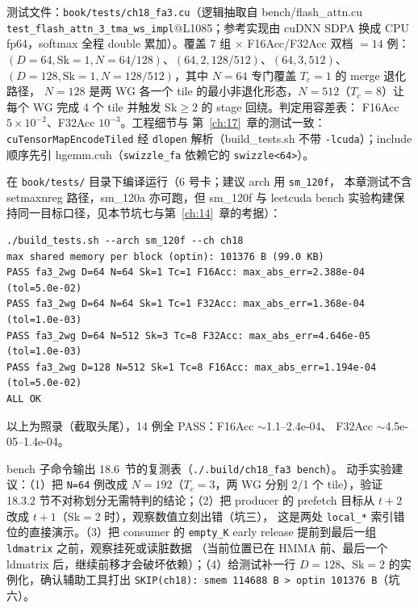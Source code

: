 测试文件：\texttt{book/\allowbreak{}tests/\allowbreak{}ch18\_\allowbreak{}fa3.cu}（逻辑抽取自 bench/flash\_attn.cu
\texttt{test\_\allowbreak{}flash\_\allowbreak{}attn\_\allowbreak{}3\_\allowbreak{}tma\_\allowbreak{}ws\_\allowbreak{}impl}@L1085；参考实现由 cuDNN SDPA 换成
CPU fp64，softmax 全程 double 累加）。覆盖 7 组 $\times$ F16Acc/F32Acc 双档
$=14$ 例：$(D{=}64,\mathrm{Sk}{=}1,N{=}64/128)$、$(64,2,128/512)$、$(64,3,512)$、
$(D{=}128,\mathrm{Sk}{=}1,N{=}128/512)$，其中 $N{=}64$ 专门覆盖
$T_c{=}1$ 的 merge 退化路径，
$N{=}128$ 是两 WG 各一个 tile 的最小非退化形态，$N{=}512$（$T_c{=}8$）让每个
WG 完成 4 个 tile 并触发 $\mathrm{Sk}{\ge}2$ 的 stage 回绕。判定用容差表：
F16Acc $5\times10^{-2}$、F32Acc $10^{-3}$。工程细节与
第~\ref{ch:17}~章的测试一致：\texttt{cu\allowbreak{}Tensor\allowbreak{}Map\allowbreak{}Encode\allowbreak{}Tiled} 经
\texttt{dlopen} 解析（build\_tests.sh 不带 \texttt{-lcuda}）；include 顺序先引
hgemm.cuh（\texttt{swizzle\_fa} 依赖它的 \texttt{swizzle<64>}）。

在 \texttt{book/tests/} 目录下编译运行（6 号卡；建议 arch 用 \texttt{sm\_120f}，
本章测试不含 setmaxnreg 路径，sm\_120a 亦可跑，但 sm\_120f 与
leetcuda bench 实验构建保持同一目标口径，见本节坑七与第~\ref{ch:14}~章的考据）：

\begin{lstlisting}[style=console]
./build_tests.sh --arch sm_120f --ch ch18
max shared memory per block (optin): 101376 B (99.0 KB)
PASS fa3_2wg D=64 N=64 Sk=1 Tc=1 F16Acc: max_abs_err=2.388e-04 (tol=5.0e-02)
PASS fa3_2wg D=64 N=64 Sk=1 Tc=1 F32Acc: max_abs_err=1.368e-04 (tol=1.0e-03)
PASS fa3_2wg D=64 N=512 Sk=3 Tc=8 F32Acc: max_abs_err=4.646e-05 (tol=1.0e-03)
PASS fa3_2wg D=128 N=512 Sk=1 Tc=8 F16Acc: max_abs_err=1.194e-04 (tol=5.0e-02)
ALL OK
\end{lstlisting}

以上为照录（截取头尾），14 例全 PASS：F16Acc $\sim$1.1--2.4e-04、
F32Acc $\sim$4.5e-05--1.4e-04。

bench 子命令输出 18.6~节的复测表（\texttt{.\allowbreak{}/\allowbreak{}.\allowbreak{}build/\allowbreak{}ch18\_\allowbreak{}fa3 bench}）。
动手实验建议：（1）把 \texttt{N=64} 例改成 $N{=}192$（$T_c{=}3$，两 WG 分别
2/1 个 tile），验证 18.3.2 节不对称划分无需特判的结论；（2）把 producer 的
prefetch 目标从 $t+2$ 改成 $t+1$（Sk$=$2 时），观察数值立刻出错（坑三），
这是两处 \texttt{local\_*} 索引错位的直接演示。（3）把 consumer 的
\texttt{empty\_K} early release 提前到最后一组 \texttt{ldmatrix} 之前，观察挂死或读脏数据
（当前位置已在 HMMA 前、最后一个 ldmatrix 后，继续前移才会破坏依赖）；（4）给测试补一行 $D{=}128$、$\mathrm{Sk}{=}2$
的实例化，确认辅助工具打出
\texttt{SKIP(ch18): smem 114688 B > optin 101376 B}（坑六）。

